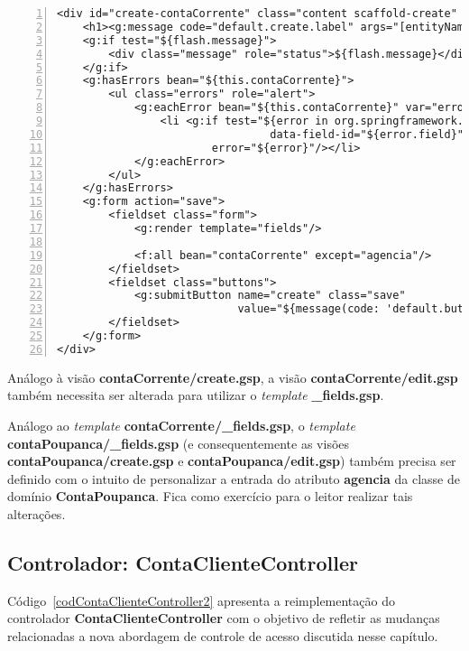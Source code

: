 \begin{lstlisting}[caption={\bf    contaCorrente/create.gsp},
    frame=trBL, float=htbp, label=codContaCorrenteCreate, numbers=left]
<div id="create-contaCorrente" class="content scaffold-create" role="main">
    <h1><g:message code="default.create.label" args="[entityName]"/></h1>
    <g:if test="${flash.message}">
        <div class="message" role="status">${flash.message}</div>
    </g:if>
    <g:hasErrors bean="${this.contaCorrente}">
        <ul class="errors" role="alert">
            <g:eachError bean="${this.contaCorrente}" var="error">
                <li <g:if test="${error in org.springframework.validation.FieldError}">
                                 data-field-id="${error.field}"</g:if>><g:message
                        error="${error}"/></li>
            </g:eachError>
        </ul>
    </g:hasErrors>
    <g:form action="save">
        <fieldset class="form">
            <g:render template="fields"/>

            <f:all bean="contaCorrente" except="agencia"/>
        </fieldset>
        <fieldset class="buttons">
            <g:submitButton name="create" class="save"
                            value="${message(code: 'default.button.create.label', default: 'Create')}"/>
        </fieldset>
    </g:form>
</div>
\end{lstlisting}

\begin{remark}
Análogo    à    visão    {\bf    contaCorrente/create.gsp},   a    visão    {\bf
  contaCorrente/edit.gsp}  também necessita  ser alterada  para utilizar  o {\it
  template} {\bf \_fields.gsp}.  

Análogo  ao {\it  template} {\bf  contaCorrente/\_fields.gsp}, o  {\it template}
{\bf   contaPoupanca/\_fields.gsp}   (e    consequentemente   as   visões   {\bf
  contaPoupanca/create.gsp} e  {\bf contaPoupanca/edit.gsp}) também  precisa ser
definido com  o intuito de personalizar  a entrada do atributo  {\bf agencia} da
classe  de  domínio {\bf  ContaPoupanca}.  Fica  como  exercício para  o  leitor
realizar tais alterações.  
\end{remark}

\subsection{Controlador: ContaClienteController}

\vspace{0.2cm}

Código~\ref{codContaClienteController2}    apresenta   a    reimplementação   do
controlador {\bf ContaClienteController} com o objetivo de refletir as mudanças
relacionadas a nova abordagem de controle de acesso discutida nesse capítulo.  

